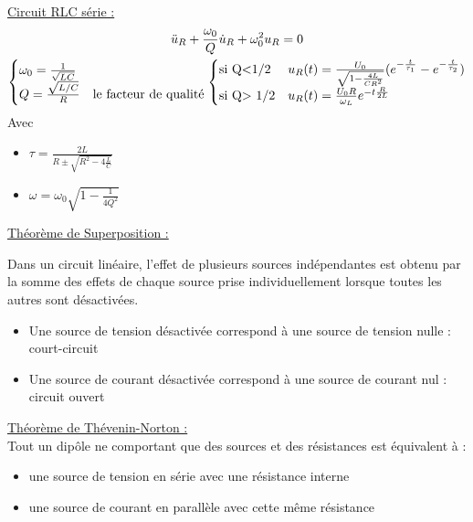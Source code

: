 \documentclass[../main.tex]{subfiles}
\begin{document}
\quad \underline{Circuit RLC série :}\\
\begin{equation}
    \begin{gathered}
        \Ddot{u}_R + \frac{\omega_0}{Q} \dot{u}_R + \omega_0^2 u_R = 0\\
        \begin{cases}
            \omega_0 = \frac{1}{\sqrt{LC}}\\
            Q = \frac{\sqrt{L/C}}{R} & \text{le facteur de qualité}\\
        \end{cases}
        \begin{cases}
            \text{si Q<1/2} & u_R(t) = \frac{U_0}{\sqrt{1-\frac{4L}{CR^2}}} (e^{-\frac{t}{\tau_1}}-e^{-\frac{t}{\tau_2}})\\
            \text{si Q> 1/2} & u_R(t) = \frac{U_0R}{\omega_L}e^{-t\frac{R}{2L}}\\
        \end{cases}
    \end{gathered}
\end{equation}
Avec \begin{itemize}
    \item $\tau = \frac{2L}{R\pm \sqrt{R^2 - 4\frac{L}{C}}}$\\
\item $\omega = \omega_0 \sqrt{1-\frac{1}{4Q^2}}$
\end{itemize}

\quad \underline{Théorème de Superposition :}\\
\begin{theorem}
    Dans un circuit linéaire, l'effet de plusieurs sources indépendantes est obtenu par la somme des effets de chaque source prise individuellement lorsque toutes les autres sont désactivées.\\
    \begin{itemize}
        \item Une source de tension désactivée correspond à une source de tension nulle : court-circuit\\
        \item Une source de courant désactivée correspond à une source de courant nul : circuit ouvert\\
    \end{itemize}
\end{theorem}

\quad \underline{Théorème de Thévenin-Norton :}\\
Tout un dipôle ne comportant que des sources et des résistances est équivalent à : \begin{itemize}
    \item une source de tension en série avec une résistance interne\\
    \item une source de courant en parallèle avec cette même résistance\\
\end{itemize}
\end{document}
